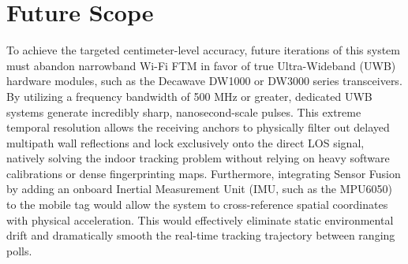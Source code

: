 \documentclass[conference]{IEEEtran}
\begin{document}
\section{Future Scope}
To achieve the targeted centimeter-level accuracy, future iterations of this system must abandon narrowband Wi-Fi FTM in favor of true Ultra-Wideband (UWB) hardware modules, such as the Decawave DW1000 or DW3000 series transceivers. By utilizing a frequency bandwidth of 500 MHz or greater, dedicated UWB systems generate incredibly sharp, nanosecond-scale pulses. This extreme temporal resolution allows the receiving anchors to physically filter out delayed multipath wall reflections and lock exclusively onto the direct LOS signal, natively solving the indoor tracking problem without relying on heavy software calibrations or dense fingerprinting maps. Furthermore, integrating Sensor Fusion by adding an onboard Inertial Measurement Unit (IMU, such as the MPU6050) to the mobile tag would allow the system to cross-reference spatial coordinates with physical acceleration. This would effectively eliminate static environmental drift and dramatically smooth the real-time tracking trajectory between ranging polls.
\end{document}
